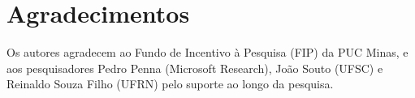 \section{Agradecimentos}

Os autores agradecem ao Fundo de Incentivo à Pesquisa (FIP) da PUC Minas, e aos pesquisadores Pedro Penna (Microsoft Research), João Souto (UFSC) e Reinaldo Souza Filho (UFRN) pelo suporte ao longo da pesquisa. 